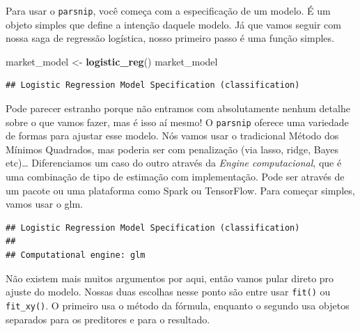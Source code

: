 \documentclass[
]{article}
\newenvironment{Shaded}{\begin{snugshade}}{\end{snugshade}}
\newcommand{\CommentTok}[1]{\textcolor[rgb]{0.56,0.35,0.01}{\textit{#1}}}
\newcommand{\DataTypeTok}[1]{\textcolor[rgb]{0.13,0.29,0.53}{#1}}
\newcommand{\KeywordTok}[1]{\textcolor[rgb]{0.13,0.29,0.53}{\textbf{#1}}}
\newcommand{\NormalTok}[1]{#1}
\newcommand{\OperatorTok}[1]{\textcolor[rgb]{0.81,0.36,0.00}{\textbf{#1}}}
\newcommand{\StringTok}[1]{\textcolor[rgb]{0.31,0.60,0.02}{#1}}
\begin{document}
Para usar o \texttt{parsnip}, você começa com a especificação de um
modelo. É um objeto simples que define a intenção daquele modelo. Já que
vamos seguir com nossa saga de regressão logística, nosso primeiro passo
é uma função simples.

\begin{Shaded}
\begin{Highlighting}[]
\NormalTok{market_model <-}\StringTok{ }\KeywordTok{logistic_reg}\NormalTok{()}
\NormalTok{market_model}
\end{Highlighting}
\end{Shaded}

\begin{verbatim}
## Logistic Regression Model Specification (classification)
\end{verbatim}

Pode parecer estranho porque não entramos com absolutamente nenhum
detalhe sobre o que vamos fazer, mas é isso aí mesmo! O \texttt{parsnip}
oferece uma variedade de formas para ajustar esse modelo. Nós vamos usar
o tradicional Método dos Mínimos Quadrados, mas poderia ser com
penalização (via lasso, ridge, Bayes etc)\ldots{} Diferenciamos um caso
do outro através da \emph{\emph{Engine} computacional}, que é uma
combinação de tipo de estimação com implementação. Pode ser através de
um pacote ou uma plataforma como Spark ou TensorFlow. Para começar
simples, vamos usar o glm.

\begin{Shaded}
\end{Shaded}

\begin{verbatim}
## Logistic Regression Model Specification (classification)
## 
## Computational engine: glm
\end{verbatim}

Não existem mais muitos argumentos por aqui, então vamos pular direto
pro ajuste do modelo. Nossas duas escolhas nesse ponto são entre usar
\texttt{fit()} ou \texttt{fit\_xy()}. O primeiro usa o método da
fórmula, enquanto o segundo usa objetos separados para os preditores e
para o resultado.

\begin{Shaded}
\end{Shaded}
\end{document}
